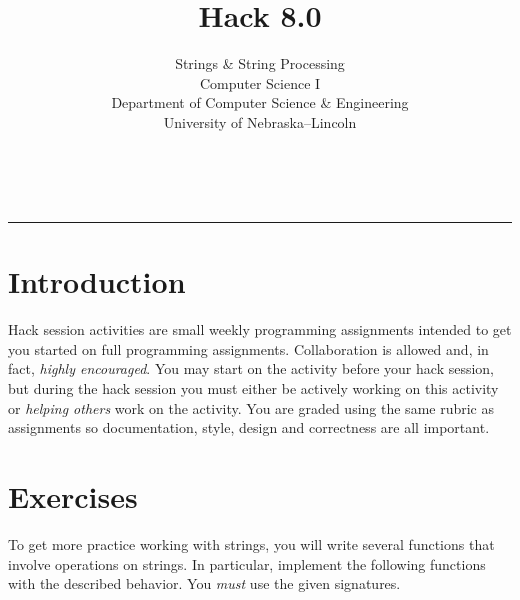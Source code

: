 \documentclass[12pt]{scrartcl}
\title{Hack 8.0}\let\Title\@title
\subtitle{Strings \& String Processing\\
Computer Science I\\
{\small
\vskip1cm
Department of Computer Science \& Engineering \\
University of Nebraska--Lincoln}
\vskip-1cm}
\date{~}
\begin{document}
\maketitle

\hrule

\section*{Introduction}

Hack session activities are small weekly programming assignments intended
to get you started on full programming assignments.  Collaboration is allowed
and, in fact, \emph{highly encouraged}.  You may start on the activity before
your hack session, but during the hack session you must either be actively 
working on this activity or \emph{helping others} work on the activity.
You are graded using the same rubric as assignments so documentation, style, 
design and correctness are all important.  

\section*{Exercises}

To get more practice working with strings, you will write several 
functions that involve operations on strings.  In particular, implement
the following functions with the described behavior.  You \emph{must}
use the given signatures.
\end{document}
